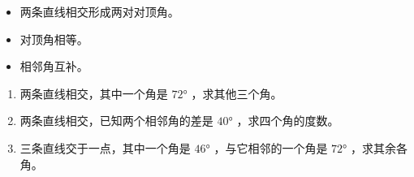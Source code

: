 \begin{keytakeaway}


\begin{itemize}
  \item 两条直线相交形成两对对顶角。
  \item 对顶角相等。
  \item 相邻角互补。
\end{itemize}


\end{keytakeaway}

\begin{practice}


\begin{enumerate}
  \item 两条直线相交，其中一个角是 $72°$ ，求其他三个角。
  \item 两条直线相交，已知两个相邻角的差是 $40°$ ，求四个角的度数。
  \item 三条直线交于一点，其中一个角是 $46°$ ，与它相邻的一个角是 $72°$ ，求其余各角。
\end{enumerate}


\end{practice}



